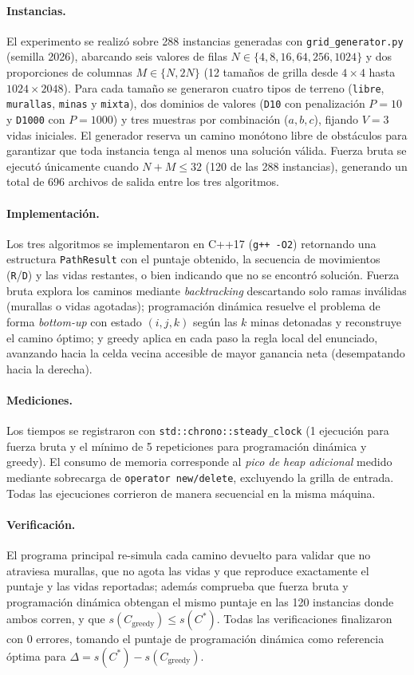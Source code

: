 \paragraph{Instancias.} El experimento se realizó sobre 288 instancias generadas con \texttt{grid\_generator.py} (semilla 2026), abarcando seis valores de filas $N \in \{4, 8, 16, 64, 256, 1024\}$ y dos proporciones de columnas $M \in \{N, 2N\}$ (12 tamaños de grilla desde $4\times 4$ hasta $1024\times 2048$). Para cada tamaño se generaron cuatro tipos de terreno (\texttt{libre}, \texttt{murallas}, \texttt{minas} y \texttt{mixta}), dos dominios de valores (\texttt{D10} con penalización $P=10$ y \texttt{D1000} con $P=1000$) y tres muestras por combinación ($a,b,c$), fijando $V=3$ vidas iniciales. El generador reserva un camino monótono libre de obstáculos para garantizar que toda instancia tenga al menos una solución válida. Fuerza bruta se ejecutó únicamente cuando $N+M \le 32$ (120 de las 288 instancias), generando un total de 696 archivos de salida entre los tres algoritmos.

\paragraph{Implementación.} Los tres algoritmos se implementaron en C++17 (\texttt{g++ -O2}) retornando una estructura \texttt{PathResult} con el puntaje obtenido, la secuencia de movimientos (\texttt{R}/\texttt{D}) y las vidas restantes, o bien indicando que no se encontró solución. Fuerza bruta explora los caminos mediante \emph{backtracking} descartando solo ramas inválidas (murallas o vidas agotadas); programación dinámica resuelve el problema de forma \emph{bottom-up} con estado $(i,j,k)$ según las $k$ minas detonadas y reconstruye el camino óptimo; y greedy aplica en cada paso la regla local del enunciado, avanzando hacia la celda vecina accesible de mayor ganancia neta (desempatando hacia la derecha).

\paragraph{Mediciones.} Los tiempos se registraron con \texttt{std::chrono::steady\_clock} (1 ejecución para fuerza bruta y el mínimo de 5 repeticiones para programación dinámica y greedy). El consumo de memoria corresponde al \emph{pico de heap adicional} medido mediante sobrecarga de \texttt{operator new/delete}, excluyendo la grilla de entrada. Todas las ejecuciones corrieron de manera secuencial en la misma máquina.

\paragraph{Verificación.} El programa principal re-simula cada camino devuelto para validar que no atraviesa murallas, que no agota las vidas y que reproduce exactamente el puntaje y las vidas reportadas; además comprueba que fuerza bruta y programación dinámica obtengan el mismo puntaje en las 120 instancias donde ambos corren, y que $s(C_{\text{greedy}})\le s(C^*)$. Todas las verificaciones finalizaron con 0 errores, tomando el puntaje de programación dinámica como referencia óptima para $\Delta = s(C^*) - s(C_{\text{greedy}})$.